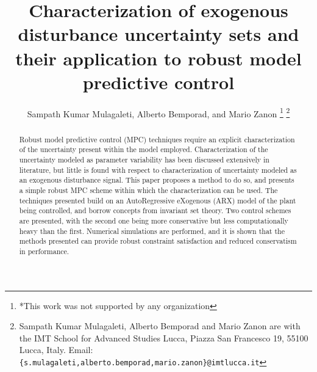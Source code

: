 \documentclass[letterpaper, 10 pt, conference]{ieeeconf}  %
\title{\LARGE \bf
Characterization of exogenous disturbance uncertainty sets and their application to robust model predictive control
}
\author{ Sampath Kumar Mulagaleti, Alberto Bemporad, and Mario Zanon %
\thanks{*This work was not supported by any organization}%
\thanks{Sampath Kumar Mulagaleti, Alberto Bemporad and Mario Zanon are with
		the IMT School for Advanced Studies Lucca, Piazza San Francesco 19,
		55100 Lucca, Italy. 
		 Email: 
	   {\tt\tiny \{s.mulagaleti,alberto.bemporad,mario.zanon\}@imtlucca.it}  }%
}
\begin{document}
\maketitle
\thispagestyle{empty}
\pagestyle{empty}


\begin{abstract}

Robust model predictive control (MPC) techniques require an explicit characterization of the uncertainty present within the model employed. Characterization of the uncertainty modeled as parameter variability has been discussed extensively in literature, but little is found with respect to characterization of uncertainty modeled as an exogenous disturbance signal. This paper proposes a method to do so, and presents a simple robust MPC scheme within which the characterization can be used. The techniques presented build on an AutoRegressive eXogenous (ARX) model of the plant being controlled, and borrow concepts from invariant set theory. Two control schemes are presented, with the second one being more conservative but less computationally heavy than the first. Numerical simulations are performed, and it is shown that the methods presented can provide robust constraint satisfaction and reduced conservatism in performance.

\end{abstract}


\end{document}
